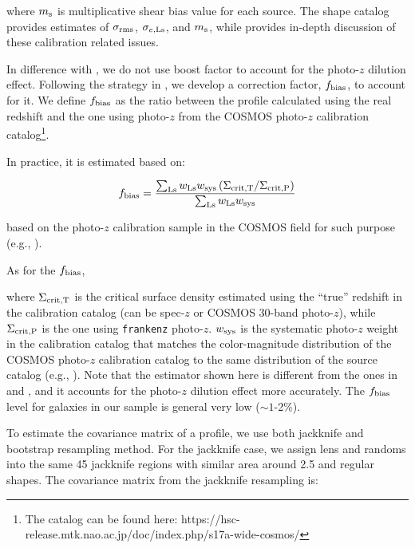 \documentclass[fleqn,usenatbib,useAMS,english]{mnras}
\begin{document}
    \noindent where $m_{\rm s}$ is multiplicative shear bias value for each source.
    The shape catalog provides estimates of $\sigma_{\rm rms}$, $\sigma_{e, \rm Ls}$, and $m_{\rm
    s}$, while \citet{HSC-WLCALIB} provides in-depth discussion of these calibration related
    issues.

    In difference with \citet{Singh2017}, we do not use boost factor to account for the photo-$z$
    dilution effect.
    Following the strategy in \citet{Leauthaud2017}, we develop a correction
    factor, $f_{\rm bias}$, to account for it.
    We define $f_{\rm bias}$ as the ratio between the \dsigma{} profile calculated using
    the real redshift and the one using photo-$z$ from the COSMOS photo-$z$ calibration
    catalog\footnote{The catalog can be found here:
    https://hsc-release.mtk.nao.ac.jp/doc/index.php/s17a-wide-cosmos/}.

    In practice, it is estimated based on:

    \begin{equation}
        f_{\rm bias} = \frac{
            \sum_{\rm Ls} w_{\rm Ls} w_{\rm sys} \left(\Sigma_{{\rm crit, T}} / \Sigma_{{\rm crit, P}} \right)}
            {\sum_{\rm Ls} w_{\rm Ls} w_{\rm sys}}
        \label{eq:fbias}
    \end{equation}

    based on the photo-$z$ calibration sample in the COSMOS field for
    such purpose
    (e.g., \citealt{Mandelbaum2008, Nakajima2012, Leauthaud2017}).

    As for the $f_{\rm bias}$,

    \noindent where $\Sigma_{{\rm crit, T}}$ is the critical surface density estimated using the
    ``true'' redshift in the calibration catalog (can be spec-$z$ or COSMOS 30-band photo-$z$),
    while $\Sigma_{{\rm crit, P}}$ is the one using \texttt{frankenz} photo-$z$.
    $w_{\rm sys}$ is the systematic photo-$z$ weight in the calibration catalog that matches the
    color-magnitude distribution of the COSMOS photo-$z$ calibration catalog to the same
    distribution of the source catalog (e.g., \citealt{Mandelbaum2008, Nakajima2012}).
    Note that the estimator shown here is different from the ones in \citet{Leauthaud2017} and
    \citet{Speagle2019}, and it accounts for the photo-$z$ dilution effect more accurately.
    The $f_{\rm bias}$ level for galaxies in our sample is general very low ($\sim 1$-2\%).

    To estimate the covariance matrix of a \dsigma{} profile, we use both jackknife and
    bootstrap resampling method.
    For the jackknife case, we assign lens and randoms into the same 45 jackknife regions with
    similar area around 2.5 \sqdeg{} and regular shapes.
    The covariance matrix from the jackknife resampling is:
\end{document}
